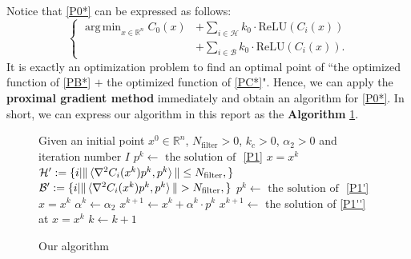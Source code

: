 \documentclass[conference]{IEEEtran}
\makeatletter
\DeclareMathOperator*{\argmin}{arg\,min}
\newcommand{\removelatexerror}{\let\@latex@error\@gobble}
\makeatother
\begin{document}
Notice that \eqref{P0*} can be expressed as follows:
\begin{equation*}
\begin{cases}
    \argmin_{x\in \mathbb{R}^n} C_0(x) 
    &+ 
    \sum_{i \in \mathcal{H}} k_0\cdot\text{ReLU}(C_i(x))\\
    &+
    \sum_{i \in \mathcal{B}} k_0\cdot\text{ReLU}(C_i(x)).
\end{cases}
\end{equation*}
It is exactly an optimization problem to find an optimal point of ``the optimized function of \eqref{PB*} $+$ the optimized function of \eqref{PC*}". Hence, we can apply the \textbf{proximal gradient method} \cite{pgm} immediately and obtain an algorithm for \eqref{P0*}. In short, we can express our algorithm in this report as the \textbf{Algorithm} \ref{ouralg}.
\begin{figure}[htbp]
 \removelatexerror
  \begin{algorithm}[H]
   \caption{Our algorithm}
   Given an initial point $x^0 \in \mathbb{R}^n$, $N_{\text{filter}}>0$, $k_c >0$, $\alpha_2 >0$ and iteration number $I$\;
   {
      $p^k \gets \text{ the solution of }$ \eqref{P1}  $x = x^k$\;
      $ \mathcal{H'}:=\{i|\|\braket{\nabla^2 C_i(x^k) p^k, p^k}\| \leq N_{\text{filter}},\}$\;
      $ \mathcal{B'}:=\{i|\|\braket{\nabla^2 C_i(x^k) p^k, p^k}\| > N_{\text{filter}},\}$\;
      {
        $p^k \gets \text{ the solution of }$ \eqref{P1'}  $x = x^k$\;
        $\alpha^k\gets\alpha_2$
        $x^{k+1}\gets x^k + \alpha^k \cdot p^k$\;
      }{
        $x^{k+1}\gets$ the solution of \eqref{P1''} at $x=x^k$\;
        {\color{blue}}
      }
      $k\gets k+1$\;    
   }
   \newline

   \label{ouralg}
  \end{algorithm}
\end{figure}
\end{document}
